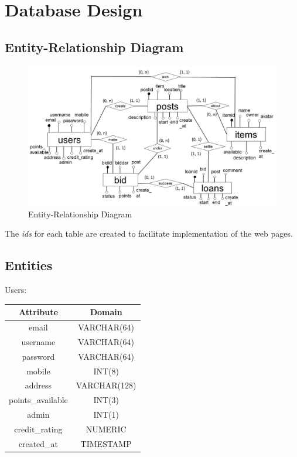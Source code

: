 \section{Database Design}

\subsection{Entity-Relationship Diagram}
\begin{figure}[h]
      \centering
	\includegraphics[scale=0.5]{er.jpg}
      \caption{Entity-Relationship Diagram}
\end{figure}

The \textit{ids} for each table are created to facilitate implementation of the web pages.

\newpage

\subsection{Entities}

\begin{center}
Users: \quad
\begin{tabular}{|c|c|}
\hline
Attribute & Domain\\
\hline
email & VARCHAR(64)\\
username & VARCHAR(64) \\
password & VARCHAR(64) \\
mobile & INT(8) \\
address & VARCHAR(128) \\
points\_available & INT(3) \\
admin & INT(1) \\
credit\_rating & NUMERIC \\
created\_at & TIMESTAMP \\
\hline
\end{tabular}
\end{center}

